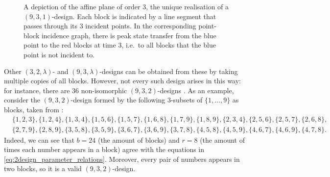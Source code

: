 \documentclass{article}
\numberwithin{equation}{section}
\begin{document}
\begin{figure}
\vspace{-20pt}
\caption{A depiction of the affine plane of order $3$, the unique realisation of a $(9,3,1)$-design. Each block is indicated by a line segment that passes through its $3$ incident points. In the corresponding point-block incidence graph, there is peak state transfer from the blue point to the red blocks at time $3$, i.e.\ to all blocks that the blue point is not incident to. \label{fig:affine_plane_peakST}}
\end{figure}

Other $(3,2,\lambda)$- and $(9,3,\lambda)$-designs can be obtained from these by taking multiple copies of all blocks. However, not every such design arises in this way: for instance, there are $36$ non-isomorphic $(9,3,2)$-designs \cite{ColDin2007}. As an example, consider the $(9,3,2)$-design formed by the following $3$-subsets of $\{1,\ldots,9\}$ as blocks, taken from \cite{ColDin2007}:
\[
\begin{split}
&\{1,2,3\},
\{1,2,4\},
\{1,3,4\},
\{1,5,6\},
\{1,5,7\},
\{1,6,8\},
\{1,7,9\},
\{1,8,9\},
\{2,3,4\},
\{2,5,6\},
\{2,5,7\},
\{2,6,8\}, \\
&\{2,7,9\},
\{2,8,9\},
\{3,5,8\},
\{3,5,9\},
\{3,6,7\},
\{3,6,9\},
\{3,7,8\},
\{4,5,8\},
\{4,5,9\},
\{4,6,7\},
\{4,6,9\},
\{4,7,8\}.
\end{split}
\]
Indeed, we can see that $b = 24$ (the amount of blocks) and $r = 8$ (the amount of times each number appears in a block) agree with the equations in \eqref{eq:2design_parameter_relations}. Moreover, every pair of numbers appears in two blocks, so it is a valid $(9,3,2)$-design.
\end{document}
